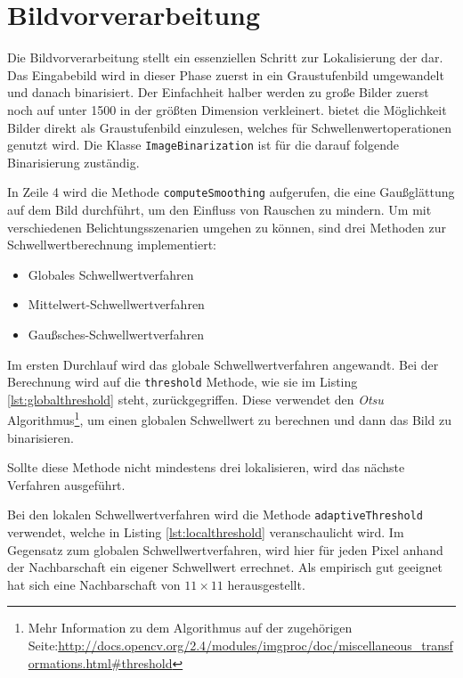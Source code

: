 \chapter{Bildvorverarbeitung}
Die Bildvorverarbeitung stellt ein essenziellen Schritt zur Lokalisierung der \QRCodes dar. Das Eingabebild wird in dieser Phase zuerst in ein Graustufenbild umgewandelt und danach binarisiert. Der Einfachheit halber werden zu große Bilder zuerst noch auf unter 1500 in der größten Dimension verkleinert. \OpenCV bietet die Möglichkeit Bilder direkt als Graustufenbild einzulesen, welches für Schwellenwertoperationen genutzt wird.
Die Klasse \texttt{ImageBinarization} ist für die darauf folgende Binarisierung zuständig. 

In Zeile 4 wird die Methode \texttt{computeSmoothing} aufgerufen, die eine Gaußglättung auf dem Bild durchführt, um den Einfluss von Rauschen zu mindern. Um mit verschiedenen Belichtungsszenarien umgehen zu können, sind drei Methoden zur Schwellwertberechnung implementiert:
\begin{itemize}
	\item Globales Schwellwertverfahren
	\item Mittelwert-Schwellwertverfahren
	\item Gaußsches-Schwellwertverfahren
\end{itemize}
Im ersten Durchlauf wird das globale Schwellwertverfahren angewandt. Bei der Berechnung wird auf die \texttt{threshold} Methode, wie sie im Listing \ref{lst:globalthreshold} steht, zurückgegriffen. Diese verwendet den \emph{Otsu} Algorithmus\footnote{Mehr Information zu dem Algorithmus auf der zugehörigen \OpenCV Seite:\url{http://docs.opencv.org/2.4/modules/imgproc/doc/miscellaneous_transformations.html\#threshold}}, um einen globalen Schwellwert zu berechnen und dann das Bild zu binarisieren.

Sollte diese Methode nicht mindestens drei \fps lokalisieren, wird das nächste Verfahren ausgeführt.


Bei den lokalen Schwellwertverfahren wird die Methode \texttt{adaptiveThreshold} verwendet, welche in Listing \ref{lst:localthreshold} veranschaulicht wird. Im Gegensatz zum globalen Schwellwertverfahren, wird hier für jeden Pixel anhand der Nachbarschaft ein eigener Schwellwert errechnet. Als empirisch gut geeignet hat sich eine Nachbarschaft von $11 \times 11$ herausgestellt.

